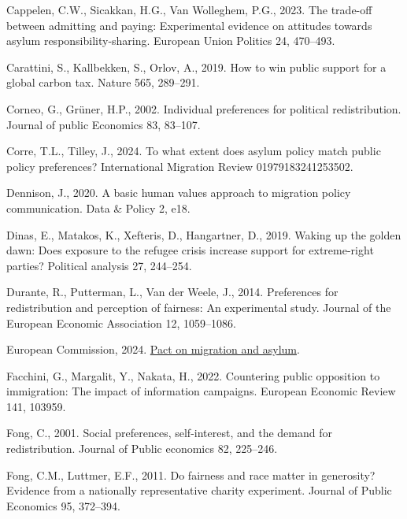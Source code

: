 \documentclass[
  12pt,
  a4paper,
]{article}
\newlength{\cslhangindent}
\newenvironment{CSLReferences}[2] %
 {\begin{list}{}{%
  \setlength{\itemindent}{0pt}
  \setlength{\leftmargin}{0pt}
  \setlength{\parsep}{0pt}
  \ifodd #1
   \setlength{\leftmargin}{\cslhangindent}
   \setlength{\itemindent}{-1\cslhangindent}
  \fi
  \setlength{\itemsep}{#2\baselineskip}}}
 {\end{list}}
\begin{document}
\begin{CSLReferences}{1}{0}
Cappelen, C.W., Sicakkan, H.G., Van Wolleghem, P.G., 2023. The trade-off between admitting and paying: Experimental evidence on attitudes towards asylum responsibility-sharing. European Union Politics 24, 470--493.

Carattini, S., Kallbekken, S., Orlov, A., 2019. How to win public support for a global carbon tax. Nature 565, 289--291.

Corneo, G., Grüner, H.P., 2002. Individual preferences for political redistribution. Journal of public Economics 83, 83--107.

Corre, T.L., Tilley, J., 2024. To what extent does asylum policy match public policy preferences? International Migration Review 01979183241253502.

Dennison, J., 2020. A basic human values approach to migration policy communication. Data \& Policy 2, e18.

Dinas, E., Matakos, K., Xefteris, D., Hangartner, D., 2019. Waking up the golden dawn: Does exposure to the refugee crisis increase support for extreme-right parties? Political analysis 27, 244--254.

Durante, R., Putterman, L., Van der Weele, J., 2014. Preferences for redistribution and perception of fairness: An experimental study. Journal of the European Economic Association 12, 1059--1086.

European Commission, 2024. \href{https://op.europa.eu/en/publication-detail/-/publication/a426d987-0767-11ef-a251-01aa75ed71a1/}{{Pact on migration and asylum}}.

Facchini, G., Margalit, Y., Nakata, H., 2022. Countering public opposition to immigration: The impact of information campaigns. European Economic Review 141, 103959.

Fong, C., 2001. Social preferences, self-interest, and the demand for redistribution. Journal of Public economics 82, 225--246.

Fong, C.M., Luttmer, E.F., 2011. Do fairness and race matter in generosity? Evidence from a nationally representative charity experiment. Journal of Public Economics 95, 372--394.


\end{CSLReferences}
\end{document}
